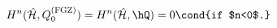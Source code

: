 \begin{equation}
%
H^{n}(\hat{\cal H}, Q^{\rm (FGZ)}_{0}) = H^{n}(\hat{\cal H}, \hQ) = 0 
\cond{if $n<0$.}
%
\end{equation}

